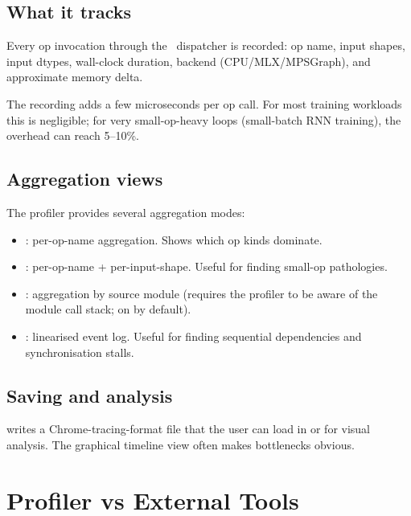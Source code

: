 \subsection{What it tracks}
\label{ssec:profiler_determinism:tracks}

Every op invocation through the \Lucid\ dispatcher is recorded:
op name, input shapes, input dtypes, wall-clock duration,
backend (CPU/MLX/MPSGraph), and approximate memory delta.

The recording adds a few microseconds per op call. For most
training workloads this is negligible; for very small-op-heavy
loops (small-batch RNN training), the overhead can reach 5--10\%.

\subsection{Aggregation views}
\label{ssec:profiler_determinism:views}

The profiler provides several aggregation modes:

\begin{itemize}
  \item {}: per-op-name aggregation. Shows which
    op kinds dominate.
  \item {}: per-op-name + per-input-shape. Useful
    for finding small-op pathologies.
  \item {}: aggregation by source module
    (requires the profiler to be aware of the module call stack;
    on by default).
  \item {}: linearised event log. Useful for
    finding sequential dependencies and synchronisation stalls.
\end{itemize}

\subsection{Saving and analysis}
\label{ssec:profiler_determinism:saving}

 writes a
Chrome-tracing-format file that the user can load in
 or  for visual
analysis. The graphical timeline view often makes bottlenecks
obvious.

\section{Profiler vs External Tools}
\label{sec:profiler_determinism:vs_external}

